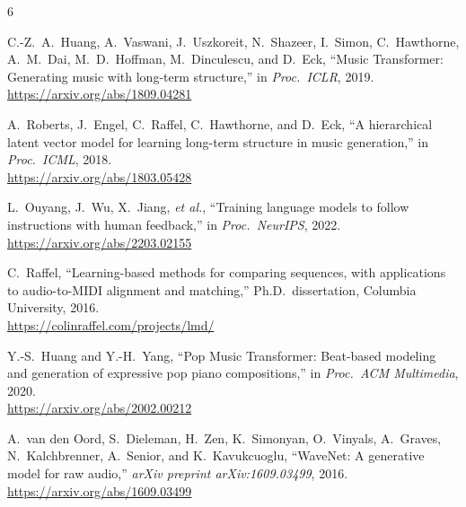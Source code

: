 \documentclass[conference]{IEEEtran}
\begin{document}
\begin{thebibliography}{6}

C.-Z.~A.~Huang, A.~Vaswani, J.~Uszkoreit, N.~Shazeer, I.~Simon, C.~Hawthorne, A.~M.~Dai, M.~D.~Hoffman, M.~Dinculescu, and D.~Eck,
``Music Transformer: Generating music with long-term structure,''
in \textit{Proc.\ ICLR}, 2019.
\\\url{https://arxiv.org/abs/1809.04281}

A.~Roberts, J.~Engel, C.~Raffel, C.~Hawthorne, and D.~Eck,
``A hierarchical latent vector model for learning long-term structure in music generation,''
in \textit{Proc.\ ICML}, 2018.
\\\url{https://arxiv.org/abs/1803.05428}

L.~Ouyang, J.~Wu, X.~Jiang, \textit{et al.},
``Training language models to follow instructions with human feedback,''
in \textit{Proc.\ NeurIPS}, 2022.
\\\url{https://arxiv.org/abs/2203.02155}

C.~Raffel,
``Learning-based methods for comparing sequences, with applications to audio-to-MIDI alignment and matching,''
Ph.D.\ dissertation, Columbia University, 2016.
\\\url{https://colinraffel.com/projects/lmd/}

Y.-S.~Huang and Y.-H.~Yang,
``Pop Music Transformer: Beat-based modeling and generation of expressive pop piano compositions,''
in \textit{Proc.\ ACM Multimedia}, 2020.
\\\url{https://arxiv.org/abs/2002.00212}

A.~van den Oord, S.~Dieleman, H.~Zen, K.~Simonyan, O.~Vinyals, A.~Graves, N.~Kalchbrenner, A.~Senior, and K.~Kavukcuoglu,
``WaveNet: A generative model for raw audio,''
\textit{arXiv preprint arXiv:1609.03499}, 2016.
\\\url{https://arxiv.org/abs/1609.03499}

\end{thebibliography}
\end{document}
